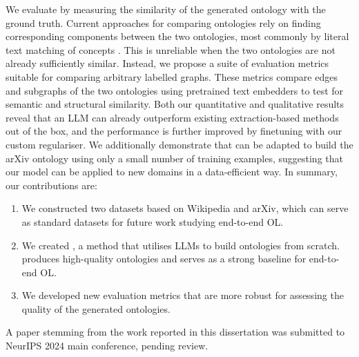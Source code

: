 We evaluate \name by measuring the similarity of the generated ontology with the ground truth. Current approaches for comparing ontologies rely on finding corresponding components between the two ontologies, most commonly by literal text matching of concepts \cite{maedche2002measuring,Treeratpituk2013GraphbasedAT}. This is unreliable when the two ontologies are not already sufficiently similar. Instead, we propose a suite of evaluation metrics suitable for comparing arbitrary labelled graphs. These metrics compare edges and subgraphs of the two ontologies using pretrained text embedders to test for semantic and structural similarity. Both our quantitative and qualitative results reveal that an LLM can already outperform existing extraction-based methods out of the box, and the performance is further improved by finetuning with our custom regulariser. We additionally demonstrate that \name can be adapted to build the arXiv ontology using only a small number of training examples, suggesting that our model can be applied to new domains in a data-efficient way. In summary, our contributions are:
\begin{enumerate}
    \item We constructed two datasets based on Wikipedia and arXiv, which can serve as standard datasets for future work studying end-to-end OL.
    \item We created \name, a method that utilises LLMs to build ontologies from scratch. \name produces high-quality ontologies and serves as a strong baseline for end-to-end OL.
    \item We developed new evaluation metrics that are more robust for assessing the quality of the generated ontologies.
\end{enumerate}

A paper stemming from the work reported in this dissertation was submitted to NeurIPS 2024 main conference, pending review.